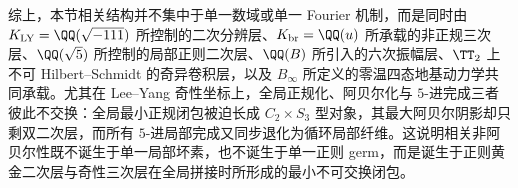 

综上，本节相关结构并不集中于单一数域或单一 Fourier 机制，而是同时由 \(K_{\mathrm{LY}}=\QQ(\sqrt{-111})\) 所控制的二次分辨层、\(K_{\mathrm{br}}=\QQ(u)\) 所承载的非正规三次层、\(\QQ(\sqrt5)\) 所控制的局部正则二次层、\(\QQ(B)\) 所引入的六次振幅层、\(\TT_2\) 上不可 Hilbert--Schmidt 的奇异卷积层，以及 \(B_\infty\) 所定义的零温四态地基动力学共同承载。尤其在 Lee--Yang 奇性坐标上，全局正规化、阿贝尔化与 \(5\)-进完成三者彼此不交换：全局最小正规闭包被迫长成 \(C_2\times S_3\) 型对象，其最大阿贝尔阴影却只剩双二次层，而所有 \(5\)-进局部完成又同步退化为循环局部纤维。这说明相关非阿贝尔性既不诞生于单一局部坏素，也不诞生于单一正则 germ，而是诞生于正则黄金二次层与奇性三次层在全局拼接时所形成的最小不可交换闭包。

\endinput
